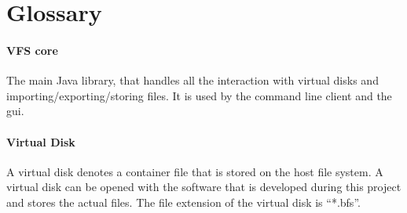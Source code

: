 \section{Glossary}

\paragraph{VFS core} The main Java library, that handles all the interaction
with virtual disks and importing/exporting/storing files. It is used by the
command line client and the gui.

\paragraph{Virtual Disk} A virtual disk denotes a container file that is stored
on the host file system. A virtual disk can be opened with the software that is
developed during this project and stores the actual files. The file extension of
the virtual disk is ``*.bfs''.